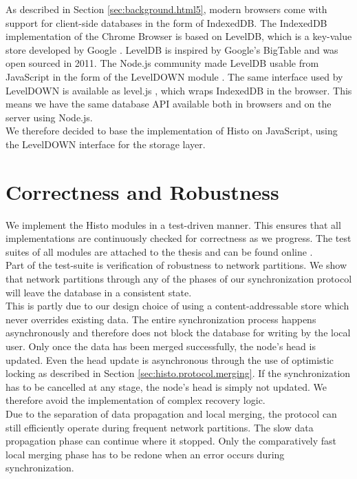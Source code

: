 As described in Section \ref{sec:background.html5}, modern browsers come with support for client-side databases in the form of IndexedDB.
The IndexedDB implementation of the Chrome Browser is based on LevelDB, which is a key-value store developed by Google \cite{leveldb}.
LevelDB is inspired by Google's BigTable \cite{chang2008bigtable} and was open sourced in 2011.
The Node.js community made LevelDB usable from JavaScript in the form of the LevelDOWN module \cite{leveldown}.
The same interface used by LevelDOWN is available as level.js \cite{leveljs}, which wraps IndexedDB in the browser.
This means we have the same database API available both in browsers and on the server using Node.js.\\
We therefore decided to base the implementation of Histo on JavaScript, using the LevelDOWN interface for the storage layer.

\section{Correctness and Robustness}
We implement the Histo modules in a test-driven manner.
This ensures that all implementations are continuously checked for correctness as we progress.
The test suites of all modules are attached to the thesis and can be found online \cite{histo-source}.\\

Part of the test-suite is verification of robustness to network partitions.
We show that network partitions through any of the phases of our synchronization protocol will leave the database in a consistent state.\\
This is partly due to our design choice of using a content-addressable store which never overrides existing data.
The entire synchronization process happens asynchronously and therefore does not block the database for writing by the local user.
Only once the data has been merged successfully, the node's head is updated.
Even the head update is asynchronous through the use of optimistic locking as described in Section \ref{sec:histo.protocol.merging}.
If the synchronization has to be cancelled at any stage, the node's head is simply not updated.
We therefore avoid the implementation of complex recovery logic.\\
Due to the separation of data propagation and local merging, the protocol can still efficiently operate during frequent network partitions.
The slow data propagation phase can continue where it stopped.
Only the comparatively fast local merging phase has to be redone when an error occurs during synchronization.

